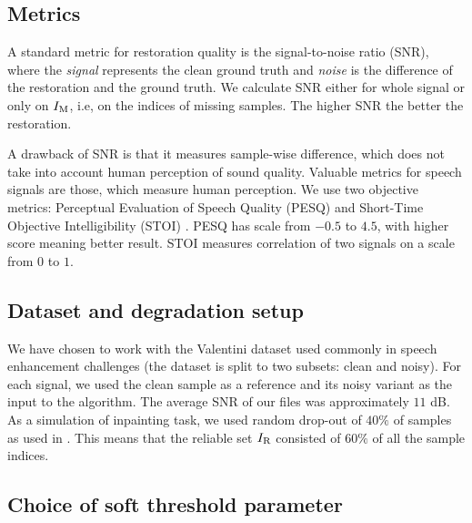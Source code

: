 \documentclass[conference]{IEEEtran}
\newcommand{\todo}[1]{\textcolor{red}{#1}}
\begin{document}
\subsection{Metrics}\label{subsec:metrics}


A standard metric for restoration quality is the signal-to-noise ratio (SNR), where the \textit{signal} represents the clean ground truth and \textit{noise} is the difference of the restoration and the ground truth.
We calculate SNR either for whole signal or only on $I_\textup{M}$, i.e, on the indices of missing samples.
The higher SNR the better the restoration.

A drawback of SNR is that it measures sample-wise difference, which does not take into account human perception of sound quality.
Valuable metrics for speech signals are those, which measure human perception.
We use two objective metrics: Perceptual Evaluation of Speech Quality (PESQ) \cite{Rix2001} and 
Short-Time Objective Intelligibility (STOI) \cite{Taal2010}.
PESQ has scale from $-0.5$ to $4.5$, with higher score meaning better result.
STOI measures correlation of two signals on a scale from $0$ to $1$.

\subsection{Dataset and degradation setup}
We have chosen to work with
the Valentini dataset \cite{ValentiniBotinhao2017} used commonly in speech enhancement challenges (the dataset is split to two subsets: clean and noisy).
For each signal, we used the clean sample as a reference and its noisy variant as the input to the algorithm. %
The average SNR of our files was approximately $11$ dB.
As a simulation of inpainting task, we used random drop-out of %
$40\%$ of samples as used in \cite{Mokry2021}.
This means that the reliable set $I_\textup{R}$ consisted of $60\%$ of all the sample indices.

\subsection{Choice of soft threshold parameter}\label{subsec:soft_thresh}
\end{document}
